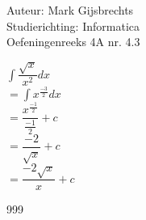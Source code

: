 \documentclass[a4paper]{article}
\newcommand{\dint}{\displaystyle\int}
\begin{document}
\noindent \large Auteur: Mark Gijsbrechts \\
\noindent \large Studierichting: Informatica\\
\noindent \large Oefeningenreeks 4A nr. 4.3\\

\medskip

\normalsize





$ \dint \dfrac{\sqrt{x}}{x^2} dx $ \\

$= \dint x^{\tfrac{-3}{2}} dx$ \\

$=  \dfrac{x^{\tfrac{-1}{2}}}{\tfrac{-1}{2}} + c $ \\
 
$= \dfrac{-2}{\sqrt{x}} + c $ \\

$= \dfrac{-2\sqrt{x}}{x} + c $



\begin{thebibliography}{999}
\end{thebibliography}
\end{document}
